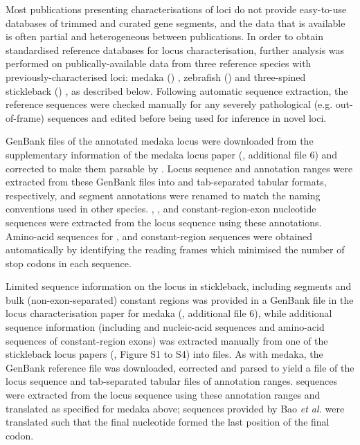 Most publications presenting characterisations of \igh{} loci do not provide easy-to-use databases of trimmed and curated gene segments, and the data that is available is often partial and heterogeneous between publications. In order to obtain standardised reference databases for locus characterisation, further analysis was performed on publically-available data from three reference species with previously-characterised \igh{} loci: medaka () \parencite{magadan2011medaka}, zebrafish () \parencite{danilova2005zebrafish} and three-spined stickleback () \parencite{bao2010stickleback,gambondeza2011stickleback}, as described below. Following automatic sequence extraction, the reference sequences were checked manually for any severely pathological (e.g. out-of-frame) sequences and edited before being used for inference in novel loci.


\noindent GenBank files of the annotated medaka \igh{} locus were downloaded from the supplementary information of the medaka locus paper (\parencite{magadan2011medaka}, additional file 6) and corrected to make them parsable by . Locus sequence and annotation ranges were extracted from these GenBank files into  and tab-separated tabular formats, respectively, and segment annotations were renamed to match the naming conventions used in other species. \vh, \dh, \jh and constant-region-exon nucleotide sequences were extracted from the locus sequence using these annotations. Amino-acid sequences for \vh, \jh and constant-region sequences were obtained automatically by identifying the reading frames which minimised the number of stop codons in each sequence.


\noindent Limited sequence information on the \igh{} locus in stickleback, including \vh segments and bulk (non-exon-separated) constant regions was provided in a GenBank file in the locus characterisation paper for medaka (\parencite{magadan2011medaka}, additional file 6), while additional sequence information (including \dh and \jh nucleic-acid sequences and amino-acid sequences of constant-region exons) was extracted manually from one of the stickleback locus papers (\parencite{bao2010stickleback},  Figure S1 to S4) into  files. As with medaka, the GenBank reference file was downloaded, corrected and parsed to yield a  file of the locus sequence and tab-separated tabular files of annotation ranges. \vh sequences were extracted from the locus sequence using these annotation ranges and translated as specified for medaka above; \jh sequences provided by Bao \textit{et al.} \parencite{bao2010stickleback} were translated such that the final nucleotide formed the last position of the final codon.

